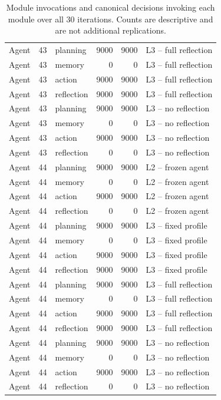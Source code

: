 \begin{table}[htbp!]
\begin{tabular}{lrlrrl}
Agent & 43 & planning & 9000 & 9000 & L3 -- full reflection \\
Agent & 43 & memory & 0 & 0 & L3 -- full reflection \\
Agent & 43 & action & 9000 & 9000 & L3 -- full reflection \\
Agent & 43 & reflection & 9000 & 9000 & L3 -- full reflection \\
Agent & 43 & planning & 9000 & 9000 & L3 -- no reflection \\
Agent & 43 & memory & 0 & 0 & L3 -- no reflection \\
Agent & 43 & action & 9000 & 9000 & L3 -- no reflection \\
Agent & 43 & reflection & 0 & 0 & L3 -- no reflection \\
Agent & 44 & planning & 9000 & 9000 & L2 -- frozen agent \\
Agent & 44 & memory & 0 & 0 & L2 -- frozen agent \\
Agent & 44 & action & 9000 & 9000 & L2 -- frozen agent \\
Agent & 44 & reflection & 0 & 0 & L2 -- frozen agent \\
Agent & 44 & planning & 9000 & 9000 & L3 -- fixed profile \\
Agent & 44 & memory & 0 & 0 & L3 -- fixed profile \\
Agent & 44 & action & 9000 & 9000 & L3 -- fixed profile \\
Agent & 44 & reflection & 9000 & 9000 & L3 -- fixed profile \\
Agent & 44 & planning & 9000 & 9000 & L3 -- full reflection \\
Agent & 44 & memory & 0 & 0 & L3 -- full reflection \\
Agent & 44 & action & 9000 & 9000 & L3 -- full reflection \\
Agent & 44 & reflection & 9000 & 9000 & L3 -- full reflection \\
Agent & 44 & planning & 9000 & 9000 & L3 -- no reflection \\
Agent & 44 & memory & 0 & 0 & L3 -- no reflection \\
Agent & 44 & action & 9000 & 9000 & L3 -- no reflection \\
Agent & 44 & reflection & 0 & 0 & L3 -- no reflection \\
\hline
\end{tabular}
\caption{Module invocations and canonical decisions invoking each module over all 30 iterations. Counts are descriptive and are not additional replications.}
\label{chap:results:tab:rq3_module_totals}
\end{table}
